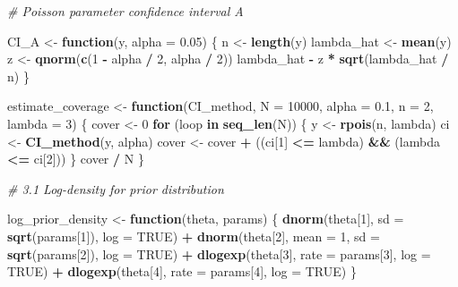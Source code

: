 \documentclass[
]{article}
\newenvironment{Shaded}{\begin{snugshade}}{\end{snugshade}}
\newcommand{\AttributeTok}[1]{\textcolor[rgb]{0.13,0.29,0.53}{#1}}
\newcommand{\CommentTok}[1]{\textcolor[rgb]{0.56,0.35,0.01}{\textit{#1}}}
\newcommand{\ConstantTok}[1]{\textcolor[rgb]{0.56,0.35,0.01}{#1}}
\newcommand{\ControlFlowTok}[1]{\textcolor[rgb]{0.13,0.29,0.53}{\textbf{#1}}}
\newcommand{\DecValTok}[1]{\textcolor[rgb]{0.00,0.00,0.81}{#1}}
\newcommand{\FloatTok}[1]{\textcolor[rgb]{0.00,0.00,0.81}{#1}}
\newcommand{\FunctionTok}[1]{\textcolor[rgb]{0.13,0.29,0.53}{\textbf{#1}}}
\newcommand{\NormalTok}[1]{#1}
\newcommand{\OtherTok}[1]{\textcolor[rgb]{0.56,0.35,0.01}{#1}}
\newcommand{\SpecialCharTok}[1]{\textcolor[rgb]{0.81,0.36,0.00}{\textbf{#1}}}
\begin{document}
\begin{Shaded}
\begin{Highlighting}[]
\CommentTok{\# Poisson parameter confidence interval A}

\NormalTok{CI\_A }\OtherTok{\textless{}{-}} \ControlFlowTok{function}\NormalTok{(y, }\AttributeTok{alpha =} \FloatTok{0.05}\NormalTok{) \{}
\NormalTok{  n }\OtherTok{\textless{}{-}} \FunctionTok{length}\NormalTok{(y)}
\NormalTok{  lambda\_hat }\OtherTok{\textless{}{-}} \FunctionTok{mean}\NormalTok{(y)}
\NormalTok{  z }\OtherTok{\textless{}{-}} \FunctionTok{qnorm}\NormalTok{(}\FunctionTok{c}\NormalTok{(}\DecValTok{1} \SpecialCharTok{{-}}\NormalTok{ alpha }\SpecialCharTok{/} \DecValTok{2}\NormalTok{, alpha }\SpecialCharTok{/} \DecValTok{2}\NormalTok{))}
\NormalTok{  lambda\_hat }\SpecialCharTok{{-}}\NormalTok{ z }\SpecialCharTok{*} \FunctionTok{sqrt}\NormalTok{(lambda\_hat }\SpecialCharTok{/}\NormalTok{ n)}
\NormalTok{\}}

\NormalTok{estimate\_coverage }\OtherTok{\textless{}{-}} \ControlFlowTok{function}\NormalTok{(CI\_method, }\AttributeTok{N =} \DecValTok{10000}\NormalTok{,}
                              \AttributeTok{alpha =} \FloatTok{0.1}\NormalTok{,}
                              \AttributeTok{n =} \DecValTok{2}\NormalTok{,}
                              \AttributeTok{lambda =} \DecValTok{3}\NormalTok{) \{}
\NormalTok{  cover }\OtherTok{\textless{}{-}} \DecValTok{0}
  \ControlFlowTok{for}\NormalTok{ (loop }\ControlFlowTok{in} \FunctionTok{seq\_len}\NormalTok{(N)) \{}
\NormalTok{    y }\OtherTok{\textless{}{-}} \FunctionTok{rpois}\NormalTok{(n, lambda)}
\NormalTok{    ci }\OtherTok{\textless{}{-}} \FunctionTok{CI\_method}\NormalTok{(y, alpha)}
\NormalTok{    cover }\OtherTok{\textless{}{-}}\NormalTok{ cover }\SpecialCharTok{+}\NormalTok{ ((ci[}\DecValTok{1}\NormalTok{] }\SpecialCharTok{\textless{}=}\NormalTok{ lambda) }\SpecialCharTok{\&\&}\NormalTok{ (lambda }\SpecialCharTok{\textless{}=}\NormalTok{ ci[}\DecValTok{2}\NormalTok{]))}
\NormalTok{  \}}
\NormalTok{  cover }\SpecialCharTok{/}\NormalTok{ N}
\NormalTok{\}}

\CommentTok{\# 3.1 Log{-}density for prior distribution}

\NormalTok{log\_prior\_density }\OtherTok{\textless{}{-}} \ControlFlowTok{function}\NormalTok{(theta, params) \{ }
    \FunctionTok{dnorm}\NormalTok{(theta[}\DecValTok{1}\NormalTok{], }\AttributeTok{sd =} \FunctionTok{sqrt}\NormalTok{(params[}\DecValTok{1}\NormalTok{]), }\AttributeTok{log =} \ConstantTok{TRUE}\NormalTok{) }\SpecialCharTok{+}
    \FunctionTok{dnorm}\NormalTok{(theta[}\DecValTok{2}\NormalTok{], }\AttributeTok{mean =} \DecValTok{1}\NormalTok{, }\AttributeTok{sd =} \FunctionTok{sqrt}\NormalTok{(params[}\DecValTok{2}\NormalTok{]), }\AttributeTok{log =} \ConstantTok{TRUE}\NormalTok{) }\SpecialCharTok{+}
    \FunctionTok{dlogexp}\NormalTok{(theta[}\DecValTok{3}\NormalTok{], }\AttributeTok{rate =}\NormalTok{ params[}\DecValTok{3}\NormalTok{], }\AttributeTok{log =} \ConstantTok{TRUE}\NormalTok{) }\SpecialCharTok{+}
    \FunctionTok{dlogexp}\NormalTok{(theta[}\DecValTok{4}\NormalTok{], }\AttributeTok{rate =}\NormalTok{ params[}\DecValTok{4}\NormalTok{], }\AttributeTok{log =} \ConstantTok{TRUE}\NormalTok{)}
\NormalTok{\}}


\end{Highlighting}
\end{Shaded}
\end{document}
